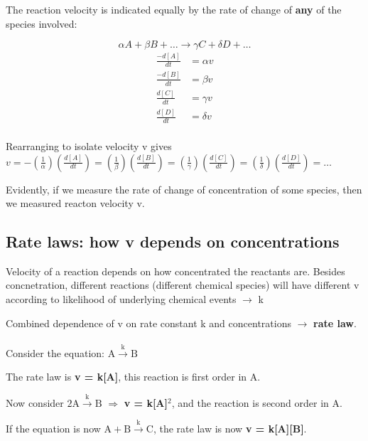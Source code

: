 \documentclass[12pt, letterpaper]{article}
\begin{document}
    The reaction velocity is indicated equally by the rate of change of \textbf{any} of the species involved:

    \begin{equation}
        \alpha A + \beta B + \dots \rightarrow \gamma C + \delta D + \dots
    \end{equation}
    \begin{align*}
        \frac{-d[A]}{dt} &= \alpha v \\
        \frac{-d[B]}{dt} &= \beta v \\
        \frac{d[C]}{dt} &= \gamma v \\
        \frac{d[D]}{dt} &= \delta v\\
    \end{align*}

    Rearranging to isolate velocity v gives \\
    
    \(v = - (\frac{1}{\alpha})(\frac{d[A]}{dt}) = (\frac{1}{\beta})(\frac{d[B]}{dt}) = (\frac{1}{\gamma})(\frac{d[C]}{dt}) = (\frac{1}{\delta})(\frac{d[D]}{dt}) = \dots \)
    
    Evidently, if we measure the rate of change of concentration of some species, then we measured reacton velocity v.

    \subsection*{Rate laws: how v depends on concentrations}
    Velocity of a reaction depends on how concentrated the reactants are. Besides concnetration, different reactions 
    (different chemical species) will have different v according to likelihood of underlying chemical events $\rightarrow$ k

    Combined dependence of v on rate constant k and concentrations $\rightarrow$ \textbf{rate law}. \\ \\

    Consider the equation: \(\mathrm{A} \stackrel{\mathrm{k}}{\longrightarrow} \mathrm{B} \)

    The rate law is \textbf{v = k[A]}, this reaction is first order in A. 

    Now consider \( 2\mathrm{A} \stackrel{\mathrm{k}}{\longrightarrow} \mathrm{B} \) $\Rightarrow$ \textbf{v = k[A]$^2$}, and the reaction is second order in A.
    


    If the equation is now \( \mathrm{A}+\mathrm{B} \stackrel{\mathrm{k}}{\longrightarrow} \mathrm{C} \), the rate law is now \textbf{v = k[A][B]}.
\end{document}
